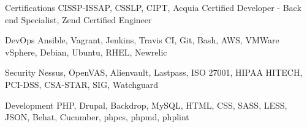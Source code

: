 


\begin{cvskills}


\cvskill
{Certifications}
{CISSP-ISSAP, CSSLP, CIPT, Acquia Certified Developer - Back end Specialist, Zend Certified Engineer }

\cvskill
{DevOps}
{Ansible, Vagrant, Jenkins, Travis CI, Git, Bash, AWS, VMWare vSphere, Debian, Ubuntu, RHEL, Newrelic }

\cvskill
{Security}
{Nessus, OpenVAS, Alienvault, Lastpass, ISO 27001, HIPAA HITECH, PCI-DSS, CSA-STAR, SIG, Watchguard }

\cvskill
{Development}
{PHP, Drupal, Backdrop, MySQL, HTML, CSS, SASS, LESS, JSON, Behat, Cucumber, phpcs, phpmd, phplint }




\end{cvskills}
